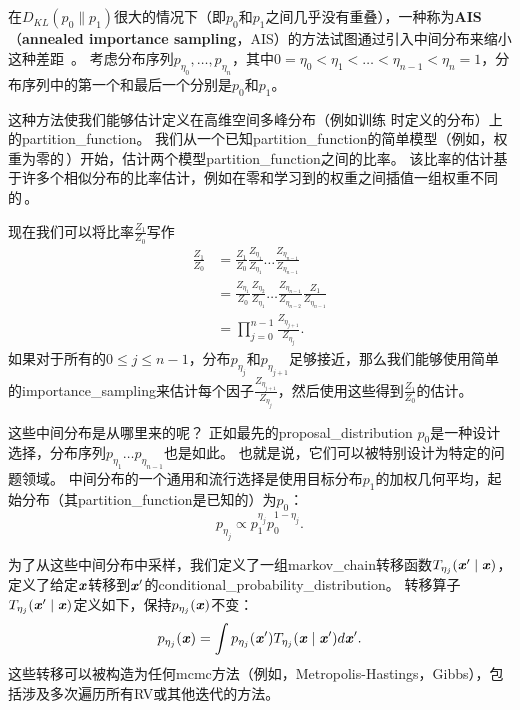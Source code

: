 \subsection{}
\label{sec:annealed_importance_sampling}
在$D_{KL}(p_0 \| p_1)$很大的情况下（即$p_0$和$p_1$之间几乎没有重叠），一种称为\textbf{\gls{AIS}}（\textbf{annealed importance sampling}，AIS）的方法试图通过引入中间分布来缩小这种差距~\citep{Jarzynski1997,Neal-2001}。
考虑分布序列$p_{\eta_0},\dots,p_{\eta_n}$，其中$0=\eta_0 < \eta_1 < \dots < \eta_{n-1} < \eta_n = 1$，分布序列中的第一个和最后一个分别是$p_0$和$p_1$。


这种方法使我们能够估计定义在高维空间多峰分布（例如训练\,\,时定义的分布）上的\gls{partition_function}。
我们从一个已知\gls{partition_function}的简单模型（例如，权重为零的\,）开始，估计两个模型\gls{partition_function}之间的比率。
该比率的估计基于许多个相似分布的比率估计，例如在零和学习到的权重之间插值一组权重不同的\,。


现在我们可以将比率$\frac{Z_1}{Z_0}$写作
\begin{align}
\frac{Z_1}{Z_0} &= \frac{Z_1}{Z_0} \frac{Z_{\eta_1}}{Z_{\eta_1}} \dots \frac{Z_{\eta_{n-1}}}{Z_{\eta_{n-1}}} \\
&= \frac{Z_{\eta_1}}{Z_{0}}  \frac{Z_{\eta_2}}{Z_{\eta_1}}  \dots \frac{Z_{\eta_{n-1}}}{Z_{\eta_{n-2}}} \frac{Z_{1}}{Z_{\eta_{n-1}}} \\
&= \prod_{j=0}^{n-1} \frac{ Z_{\eta_{j+1}} }{Z_{\eta_j}}. \label{eq:18.49}
\end{align}
如果对于所有的$0 \leq j \leq n-1$，分布$p_{\eta_j}$和$p_{\eta_{j+1}}$足够接近，那么我们能够使用简单的\gls{importance_sampling}来估计每个因子$\frac{Z_{\eta_{j+1}}}{ Z_{\eta_j}}$，然后使用这些得到$\frac{Z_1}{Z_0}$的估计。


这些中间分布是从哪里来的呢？
正如最先的\gls{proposal_distribution} $p_0$是一种设计选择，分布序列$p_{\eta_1} \dots p_{\eta_{n-1}}$也是如此。
也就是说，它们可以被特别设计为特定的问题领域。
中间分布的一个通用和流行选择是使用目标分布$p_1$的加权几何平均，起始分布（其\gls{partition_function}是已知的）为$p_0$：
\begin{equation}
	p_{\eta_j} \propto p_1^{\eta_j} p_0^{1-\eta_j}.
\end{equation}


为了从这些中间分布中采样，我们定义了一组\gls{markov_chain}转移函数$T_{\eta_j}(\boldsymbol{\mathit{x}}' \mid \boldsymbol{\mathit{x}})$，定义了给定$\boldsymbol{\mathit{x}}$转移到$\boldsymbol{\mathit{x}}'$的\gls{conditional_probability_distribution}。
转移算子$T_{\eta_j}(\boldsymbol{\mathit{x}}' \mid \boldsymbol{\mathit{x}})$定义如下，保持$p_{\eta_j}(\boldsymbol{\mathit{x}})$不变：
\begin{equation}
	p_{\eta_j}(\boldsymbol{\mathit{x}}) = \int p_{\eta_j} (\boldsymbol{\mathit{x}}') T_{\eta_j} (\boldsymbol{\mathit{x}} \mid \boldsymbol{\mathit{x}}') d\boldsymbol{\mathit{x}}'.
\end{equation}
这些转移可以被构造为任何\gls{mcmc}方法（例如，Metropolis-Hastings，Gibbs），包括涉及多次遍历所有\gls{RV}或其他迭代的方法。


